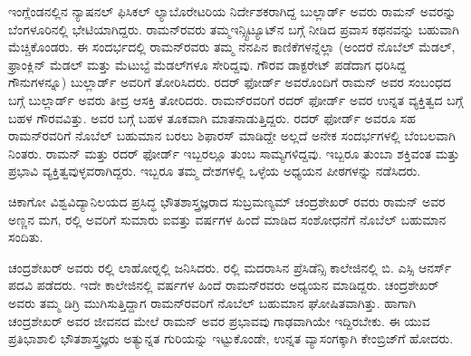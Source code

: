 
ಇಂಗ್ಲೆಂಡನಲ್ಲಿನ ನ್ಯಾಷನಲ್ ಫಿಸಿಕಲ್ ಲ್ಯಾಬೊರೇಟರಿಯ ನಿರ್ದೇಶಕರಾಗಿದ್ದ ಬುಲ್ಲಾರ್ಡ್ ಅವರು ರಾಮನ್ ಅವರನ್ನು ಬೆಂಗಳೂರಿನಲ್ಲಿ ಭೇಟಿಯಾಗಿದ್ದರು. ರಾಮನ್‍ರವರು ತಮ್ಮ\break ಇನ್ಸ್ಟಿಟ್ಯೂಟ್‍ನ ಬಗ್ಗೆ ನೀಡಿದ ಪ್ರವಾಸ ಕಥನವನ್ನು ಬಹುವಾಗಿ ಮೆಚ್ಚಿಕೊಂಡರು. ಈ ಸಂದರ್ಭದಲ್ಲಿ ರಾಮನ್‍ರವರು ತಮ್ಮ ನೆನಪಿನ ಕಾಣಿಕೆಗಳನ್ನೆಲ್ಲಾ (ಅಂದರೆ ನೊಬೆಲ್ ಮೆಡಲ್, ಫ್ರಾಂಕ್ಲಿನ್ ಮೆಡಲ್ ಮತ್ತು ಮೆಟುಬ್ಟೆ ಮೆಡಲ್‍ಗಳೂ ಸೇರಿದ್ದವು. ಗೌರವ ಡಾಕ್ಟರೇಟ್ ಪಡೆದಾಗ ಧರಿಸಿದ್ದ ಗೌನುಗಳನ್ನೂ) ಬುಲ್ಲಾರ್ಡ್ ಅವರಿಗೆ ತೋರಿಸಿದರು. ರದರ್ ಫೋರ್ಡ್ ಅವರೊಂದಿಗೆ ರಾಮನ್ ಅವರ ಸಂಬಂಧದ ಬಗ್ಗೆ ಬುಲ್ಲಾರ್ಡ್ ಅವರು ತೀವ್ರ ಆಸಕ್ತಿ ತೋರಿದರು. ರಾಮನ್‍ರವರಿಗೆ ರದರ್ ಫೋರ್ಡ್ ಅವರ ಉನ್ನತ ವ್ಯಕ್ತಿತ್ವದ ಬಗ್ಗೆ ಬಹಳ ಗೌರವವಿತ್ತು. ಅವರ ಬಗ್ಗೆ ಬಹಳ ತೂಕವಾಗಿ ಮಾತನಾಡುತ್ತಿದ್ದರು. ರದರ್ ಫೋರ್ಡ್ ಅವರೂ ಸಹ ರಾಮನ್‍ರವರಿಗೆ ನೊಬೆಲ್ ಬಹುಮಾನ ಬರಲು ಶಿಫಾರಸ್ ಮಾಡಿದ್ದೇ ಅಲ್ಲದೆ ಅನೇಕ ಸಂದರ್ಭಗಳಲ್ಲಿ ಬೆಂಬಲವಾಗಿ ನಿಂತರು. ರಾಮನ್ ಮತ್ತು ರದರ್ ಫೋರ್ಡ್ ಇಬ್ಬರಲ್ಲೂ ತುಂಬ ಸಾಮ್ಯಗಳಿದ್ದವು. ಇಬ್ಬರೂ ತುಂಬಾ ಶಕ್ತಿವಂತ ಮತ್ತು ಪ್ರಭಾವಿ ವ್ಯಕ್ತಿತ್ವವುಳ್ಳವರಾಗಿದ್ದರು. ಇಬ್ಬರೂ ತಮ್ಮ ದೇಶಗಳಲ್ಲಿ ಒಳ್ಳೆಯ ಅಧ್ಯಯನ ಪೀಠಗಳನ್ನು ನಡೆಸಿದರು.



ಚಿಕಾಗೋ ವಿಶ್ವವಿದ್ಯಾನಿಲಯದ ಪ್ರಸಿದ್ಧ ಭೌತಶಾಸ್ತ್ರಜ್ಞರಾದ ಸುಬ್ರಮಣ್ಯಮ್ ಚಂದ್ರಶೇಖರ್ ರವರು ರಾಮನ್ ಅವರ ಅಣ್ಣನ ಮಗ, ರಲ್ಲಿ ಅವರಿಗೆ ಸುಮಾರು ಐವತ್ತು ವರ್ಷಗಳ ಹಿಂದೆ ಮಾಡಿದ ಸಂಶೋಧನೆಗೆ ನೊಬೆಲ್ ಬಹುಮಾನ ಸಂದಿತು.

ಚಂದ್ರಶೇಖರ್ ಅವರು ರಲ್ಲಿ ಲಾಹೋರ್‍ನಲ್ಲಿ ಜನಿಸಿದರು. ರಲ್ಲಿ ಮದರಾಸಿನ ಪ್ರೆಸಿಡೆನ್ಸಿ ಕಾಲೇಜಿನಲ್ಲಿ ಬಿ. ಎಸ್ಸಿ ಆನರ್ಸ್ ಪದವಿ ಪಡೆದರು. ಇದೇ ಕಾಲೇಜಿನಲ್ಲಿ  ವರ್ಷಗಳ ಹಿಂದೆ ರಾಮನ್‍ರವರು ಅಧ್ಯಯನ ಮಾಡಿದ್ದರು. ಚಂದ್ರಶೇಖರ್ ಅವರು ತಮ್ಮ ಡಿಗ್ರಿ ಮುಗಿಸುತ್ತಿದ್ದಾಗ ರಾಮನ್‍ರವರಿಗೆ ನೊಬೆಲ್ ಬಹುಮಾನ ಘೋಷಿತವಾಗಿತ್ತು. ಹಾಗಾಗಿ ಚಂದ್ರಶೇಖರ್ ಅವರ ಜೀವನದ ಮೇಲೆ ರಾಮನ್ ಅವರ ಪ್ರಭಾವವು ಗಾಢವಾಗಿಯೇ ಇದ್ದಿರಬೇಕು. ಈ ಯುವ ಪ್ರತಿಭಾಶಾಲಿ ಭೌತಶಾಸ್ತ್ರಜ್ಞರು ಅತ್ಯುನ್ನತ ಗುರಿಯನ್ನು ಇಟ್ಟುಕೊಂಡೇ, ಉನ್ನತ ವ್ಯಾಸಂಗಕ್ಕಾಗಿ ಕೇಂಬ್ರಿಜ್‍ಗೆ ಹೋದರು.

